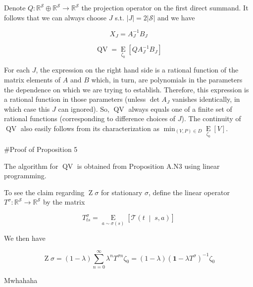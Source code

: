 \documentclass[a4paper]{article}
\newcommand{\AP}[1]{\left(#1\right)}
\newcommand{\AB}[1]{\left[#1\right]}
\newcommand{\APM}[2]{\left(#1\;\middle\vert\;#2\right)}
\newcommand{\Ea}[2]{\underset{#1}{\operatorname{E}}\AB{#2}}
\newcommand{\Reals}{\mathbb{R}}
\newcommand{\Abs}[1]{\left\vert #1 \right\vert}
\newcommand{\St}{\mathcal{S}}
\newcommand{\T}{\mathcal{T}}
\newcommand{\QV}{\operatorname{QV}}
\DeclareMathOperator{\Z}{Z}
\begin{document}
Denote $Q: \Reals^\St \oplus \Reals^\St \rightarrow \Reals^\St$ the projection operator on the first direct summand. It follows that we can always choose $J$ s.t. $\Abs{J} = 2\Abs{\St}$ and we have

$$X_J = A_J^{-1} B_J$$

$$\QV = \Ea{\zeta_0}{QA_J^{-1} B_J}$$

For each $J$, the expression on the right hand side is a rational function of the matrix elements of $A$ and $B$ which, in turn, are polynomials in the parameters the dependence on which we are trying to establish.  Therefore, this expression is a rational function in those parameters (unless $\det A_J$ vanishes identically, in which case this $J$ can ignored). So, $\QV$ always equals one of a finite set of rational functions (corresponding to difference choices of $J$). The continuity of $\QV$ also easily follows from its characterization as $\min_{(V,P) \in D}{\Ea{\zeta_0}{V}}$.

\#Proof of Proposition 5

The algorithm for $\QV$ is obtained from Proposition A.N3 using linear programming. 

To see the claim regarding $\Z\sigma$ for stationary $\sigma$, define the linear operator $T^\sigma: \Reals^\St \rightarrow \Reals^\St$ by the matrix

$$T^\sigma_{ts} = \Ea{a\sim\sigma(s)}{\T\APM{t}{s,a}}$$

We then have

$$\Z\sigma = (1-\lambda)\sum_{n=0}^\infty \lambda^n T^{\sigma n} \zeta_0 = (1-\lambda)\AP{\boldsymbol{1}-\lambda T^\sigma}^{-1}\zeta_0$$

Mwhahaha
\end{document}
